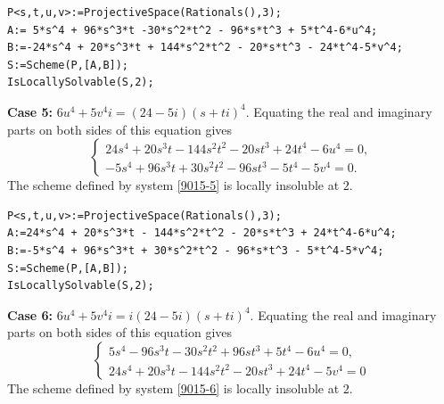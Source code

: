 \documentclass[a4paper,12pt,english,reqno]{amsart}
\begin{document}
\begin{lstlisting}
P<s,t,u,v>:=ProjectiveSpace(Rationals(),3);
A:= 5*s^4 + 96*s^3*t -30*s^2*t^2 - 96*s*t^3 + 5*t^4-6*u^4;
B:=-24*s^4 + 20*s^3*t + 144*s^2*t^2 - 20*s*t^3 - 24*t^4-5*v^4;
S:=Scheme(P,[A,B]);
IsLocallySolvable(S,2);
\end{lstlisting}



{\bf Case 5:} $6u^4+5v^4i=(24-5i)(s+ti)^4$. Equating the real and imaginary parts on both sides of this equation gives
\begin{equation}\label{9015-5}
\begin{cases}
24s^4 + 20s^3t - 144s^2t^2 - 20st^3 + 24t^4 - 6u^4=0,\\
-5s^4 + 96s^3t + 30s^2t^2 - 96st^3 - 5t^4 - 5v^4=0.
\end{cases}
\end{equation}
The scheme defined by system \eqref{9015-5} is locally insoluble at $2$.

\begin{lstlisting}
P<s,t,u,v>:=ProjectiveSpace(Rationals(),3);
A:=24*s^4 + 20*s^3*t - 144*s^2*t^2 - 20*s*t^3 + 24*t^4-6*u^4;
B:=-5*s^4 + 96*s^3*t + 30*s^2*t^2 - 96*s*t^3 - 5*t^4-5*v^4;
S:=Scheme(P,[A,B]);
IsLocallySolvable(S,2);
\end{lstlisting}

{\bf Case 6:} $6u^4+5v^4i=i(24-5i)(s+ti)^4$. Equating the real and imaginary parts on both sides of this equation gives
\begin{equation}\label{9015-6}
\begin{cases}
5s^4 - 96s^3t - 30s^2t^2 + 96st^3 + 5t^4 - 6u^4=0,\\
24s^4 + 20s^3t - 144s^2t^2 - 20st^3 + 24t^4 - 5v^4=0
\end{cases}
\end{equation}
The scheme defined by system \eqref{9015-6} is locally insoluble at $2$.
\end{document}
